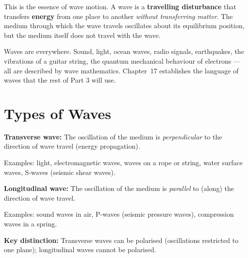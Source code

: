 This is the essence of wave motion. A wave is a
\textbf{travelling disturbance} that transfers
\textbf{energy} from one place to another
\textit{without transferring matter}. The medium
through which the wave travels oscillates about its
equilibrium position, but the medium itself does
not travel with the wave.

Waves are everywhere. Sound, light, ocean waves,
radio signals, earthquakes, the vibrations of a
guitar string, the quantum mechanical behaviour of
electrons --- all are described by wave mathematics.
Chapter~17 establishes the language of waves that
the rest of Part 3 will use.

\section{Types of Waves}

\begin{definitionbox}
\textbf{Transverse wave:} The oscillation of the
medium is \textit{perpendicular} to the direction
of wave travel (energy propagation).

Examples: light, electromagnetic waves, waves on
a rope or string, water surface waves, S-waves
(seismic shear waves).

\vspace{0.4cm}

\textbf{Longitudinal wave:} The oscillation of the
medium is \textit{parallel} to (along) the direction
of wave travel.

Examples: sound waves in air, P-waves (seismic
pressure waves), compression waves in a spring.

\vspace{0.4cm}

\textbf{Key distinction:} Transverse waves can be
polarised (oscillations restricted to one plane);
longitudinal waves cannot be polarised.
\end{definitionbox}

